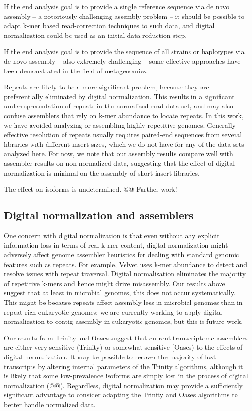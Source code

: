 \documentclass[10pt,draft]{article}
\begin{document}
If the end analysis goal is to provide a single reference sequence via
de novo assembly -- a notoriously challenging assembly problem -- it
should be possible to adapt k-mer based read-correction techniques to
such data, and digital normalization could be used as an initial data
reduction step.

If the end analysis goal is to provide the sequence of all strains or
haplotypes via de novo assembly -- also extremely challenging -- some
effective approaches have been demonstrated in the field of
metagenomics.

Repeats are likely to be a more significant problem, because they are
preferentially eliminated by digital normalization.  This results in a
significant underrepresentation of repeats in the normalized read data
set, and may also confuse assemblers that rely on k-mer abundance to
locate repeats.  In this work, we have avoided analyzing or assembling
highly repetitive genomes.  Generally, effective resolution of repeats
usually requires paired-end sequences from several libraries with
different insert sizes, which we do not have for any of the data sets
analyzed here.  For now, we note that our assembly results compare
well with assembler results on non-normalized data, suggesting that
the effect of digital normalization is minimal on the assembly of
short-insert libraries.

The effect on isoforms is undetermined.  @@  Further work!

\subsection{Digital normalization and assemblers}

One concern with digital normalization is that even without any
explicit information loss in terms of real k-mer content, digital
normalization might adversely affect genome assembler heuristics for
dealing with standard genomic features such as repeats.  For example,
Velvet uses k-mer abundance to detect and resolve issues with repeat
traversal.  Digital normalization eliminates the majority of
repetitive k-mers and hence might drive misassembly. Our results above
suggest that at least in microbial genomes, this does not occur
systematically.  This might be because repeats affect assembly less in
microbial genomes than in repeat-rich eukaryotic genomes; we are
currently working to apply digital normalization to contig assembly in
eukaryotic genomes, but this is future work.

Our results from Trinity and Oases suggest that current transcriptome
assemblers are either very sensitive (Trinity) or somewhat sensitive
(Oases) to the effects of digital normalization.  It may be possible
to recover the majority of lost transcripts by altering internal
parameters of the Trinity algorithms, although it is likely that some
low-prevalence isoforms are simply lost in the process of digital
normalization (@@).  Regardless, digital normalization may provide
a sufficiently significant advantage to consider adapting the Trinity
and Oases algorithms to better handle normalized data.
\end{document}
